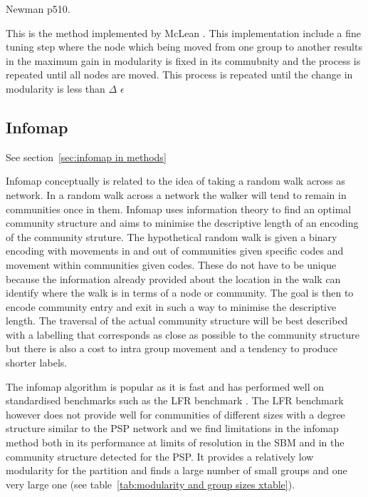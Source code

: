 Newman \cite{newman2018networks} p510.

This is the method implemented by McLean \cite{mclean2016improved}. This implementation include a fine tuning step where the node which being moved from one group to another results in the maximum gain in modularity is fixed in its commubnity and the process is repeated until all nodes are moved. This process is repeated until the change in modularity is less than $\Delta$ $\epsilon$


\subsection{Infomap}
See section~\ref{sec:infomap in methods}

Infomap conceptually is related to the idea of taking a random walk across as network. \cite{rosvall2008maps}In a random walk across a network the walker will tend to remain in communities once in them. Infomap uses information theory to find an optimal community structure and aims to minimise the descriptive length of an encoding of the community struture. The hypothetical random walk is given a binary encoding with movements in and out of communities given specific codes and movement within communities given codes. These do not have to be unique because the information already provided about the location in the walk can identify where the walk is in terms of a node or community. The goal is then to encode community entry and exit in such a way to minimise the descriptive length. The traversal of the actual community structure will be best described with a labelling that corresponds as close as possible to the community structure but there is also a cost to intra group movement and a tendency to produce shorter labels. 

The infomap algorithm is popular as it is fast and has performed well on standardised benchmarks such as the LFR benchmark .\cite{lancichinetti2008benchmark} \cite{newman2018networks} The LFR benchmark however does not provide well for communities of different sizes with a degree structure similar to the PSP network and we find limitations in the infomap method both in its performance at limits of resolution in the SBM and in the community structure detected for the PSP. It provides a relatively low modularity for the partition and finds a large number of small groups and one very large one (see table~\ref{tab:modularity and group sizes xtable}). 

